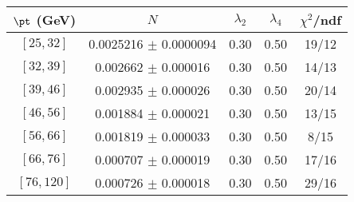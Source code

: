 \begin{tabular}{c||c|c|c|c}
$\pt$ (GeV) & $N$ & $\lambda_{2}$ & $\lambda_4$  & $\chi^2$/ndf  \\
\hline
$[25, 32]$ & 0.0025216 $\pm$ 0.0000094 & 0.30 & 0.50 & 19/12\\
$[32, 39]$ & 0.002662 $\pm$ 0.000016 & 0.30 & 0.50 & 14/13\\
$[39, 46]$ & 0.002935 $\pm$ 0.000026 & 0.30 & 0.50 & 20/14\\
$[46, 56]$ & 0.001884 $\pm$ 0.000021 & 0.30 & 0.50 & 13/15\\
$[56, 66]$ & 0.001819 $\pm$ 0.000033 & 0.30 & 0.50 & 8/15\\
$[66, 76]$ & 0.000707 $\pm$ 0.000019 & 0.30 & 0.50 & 17/16\\
$[76, 120]$ & 0.000726 $\pm$ 0.000018 & 0.30 & 0.50 & 29/16\\
\end{tabular}
